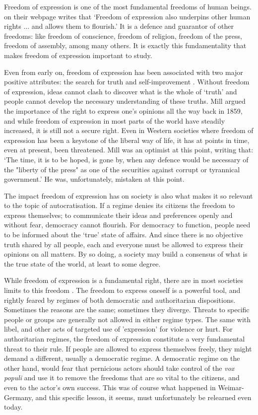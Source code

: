 Freedom of expression is one of the most fundamental freedoms of human beings. \citet{amnesty_international_freedom_2023} on their webpage writes that `Freedom of expression also underpins other human rights ... and allows them to flourish.'  It is a defence and guarantor of other freedoms: like freedom of conscience, freedom of religion, freedom of the press, freedom of assembly, among many others. It is exactly this fundamentality that makes freedom of expression important to study.

Even from early on, freedom of expression has been associated with two major positive attributes: the search for truth and self-improvement \citep[pp. 25-80]{mill_liberty_2010}. Without freedom of expression, ideas cannot clash to discover what is the whole of `truth' and people cannot develop the necessary understanding of these truths. Mill argued the importance of the right to express one's opinions all the way back in 1859, and while freedom of expression in most parts of the world have steadily increased, it is still not a secure right. Even in Western societies where freedom of expression has been a keystone of the liberal way of life, it has at points in time, even at present, been threatened. Mill was an optimist at this point, writing that: `The time, it is to be hoped, is gone by, when any defence would be necessary of the "liberty of the press" as one of the securities against corrupt or tyrannical government.'  \citep[p. 25]{mill_liberty_2010} He was, unfortunately, mistaken at this point. 

The impact freedom of expression has on society is also what makes it so relevant to the topic of autocratisation. If a regime denies its citizens the freedom to express themselves; to communicate their ideas and preferences openly and without fear, democracy cannot flourish. For democracy to function, people need to be informed about the `true' state of affairs. And since there is no objective truth shared by all people, each and everyone must be allowed to express their opinions on all matters. By so doing, a society may build a consensus of what is the true state of the world, at least to some degree. 

While freedom of expression is a fundamental right, there are in most societies limits to this freedom \citep{bonotti_freedom_2021}. The freedom to express oneself is a powerful tool, and rightly feared by regimes of both democratic and authoritarian dispositions. Sometimes the reasons are the same; sometimes they diverge. Threats to specific people or groups are generally not allowed in either regime types. The same with libel, and other acts of targeted use of 'expression' for violence or hurt. For authoritarian regimes, the freedom of expression constitute a very fundamental threat to their rule. If people are allowed to express themselves freely, they might demand a different, usually a democratic regime. A democratic regime on the other hand, would fear that pernicious actors should take control of the \textit{vox populi} and use it to remove the freedoms that are so vital to the citizens, and even to the actor's own success. This was of course what happened in Weimar-Germany, and this specific lesson, it seems, must unfortunately be relearned even today. 

